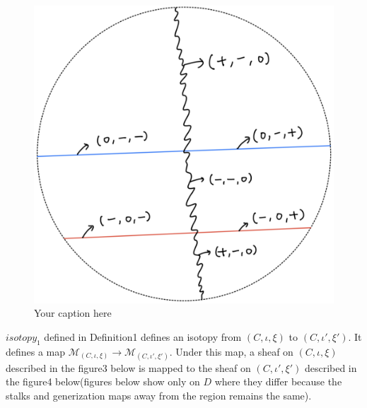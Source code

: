 \begin{figure}[H] %
    \centering
    \includegraphics[scale = 0.95]{diagrams/lemma1/2.png} %
    \caption{Your caption here}
    \label{fig:your-label}
\end{figure}

$isotopy_1$ defined in Definition1 defines an isotopy from $(C,\iota,\xi)$ to $(C,\iota',\xi')$. It defines a map $\mathcal{M}_{(C,\iota,\xi)}\rightarrow \mathcal{M}_{(C,\iota',\xi')}$. Under this map, a sheaf on $(C,\iota,\xi)$ described in the figure3 below is mapped to the sheaf on $(C,\iota',\xi')$ described in the figure4 below(figures below show only on $D$ where they differ because the stalks and generization maps away from the region remains the same).

